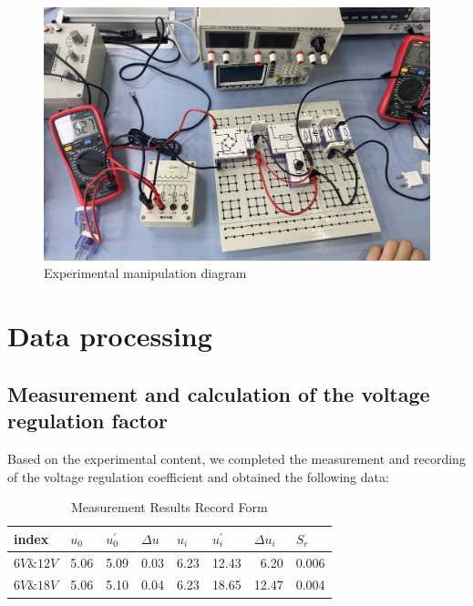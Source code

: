 \documentclass[UTF8]{article}
\begin{document}
    	\begin{figure}[H]
    	    	\centering
    	    	\includegraphics[clip,scale=0.5,trim={0 0 0 0}]{fig/fig14.png}
    	        \caption{Experimental manipulation diagram}
    	        \label{figure.14}
        \end{figure}      
	
	\section{Data processing}
   \subsection{Measurement and calculation of the voltage regulation factor}
   Based on the experimental content, we completed the measurement and recording of the voltage regulation coefficient and obtained the following data:
   \begin{table}[htbp]
     \centering
     \caption{Measurement Results Record Form}
       \begin{tabular}{lrrrrrrr}
       \toprule[2pt]
       index & \multicolumn{1}{l}{$u_0$} & \multicolumn{1}{l}{$u_{0}^{'}$} & \multicolumn{1}{l}{$\Delta u$}  & \multicolumn{1}{l}{$u_i$} & \multicolumn{1}{l}{$u_{i}^{'}$} & \multicolumn{1}{l}{$\Delta u_i$}  & \multicolumn{1}{l}{$S_r$} \\
       \midrule
       $6V \& 12V$ & 5.06  & 5.09  & 0.03  & 6.23  & 12.43 & 6.20   & 0.006 \\
       $6V \& 18V$ & 5.06  & 5.10   & 0.04  & 6.23  & 18.65 & 12.47 & 0.004 \\
       \bottomrule[2pt]
       \end{tabular}%
     \label{tab:addlabel}%
   \end{table}%
   
\end{document}
